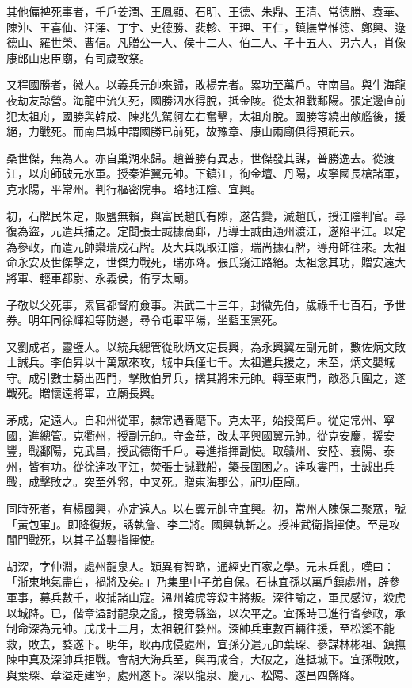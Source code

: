 \begin{pinyinscope}
其他偏裨死事者，千戶姜潤、王鳳顯、石明、王德、朱鼎、王清、常德勝、袁華、陳沖、王喜仙、汪澤、丁宇、史德勝、裴軫、王理、王仁，鎮撫常惟德、鄭興、逯德山、羅世榮、曹信。凡贈公一人、侯十二人、伯二人、子十五人、男六人，肖像康郎山忠臣廟，有司歲致祭。

又程國勝者，徽人。以義兵元帥來歸，敗楊完者。累功至萬戶。守南昌。與牛海龍夜劫友諒營。海龍中流矢死，國勝泅水得脫，抵金陵。從太祖戰鄱陽。張定邊直前犯太祖舟，國勝與韓成、陳兆先駕舸左右奮擊，太祖舟脫。國勝等繞出敵艦後，援絕，力戰死。而南昌城中謂國勝已前死，故豫章、康山兩廟俱得預祀云。

桑世傑，無為人。亦自巢湖來歸。趙普勝有異志，世傑發其謀，普勝逸去。從渡江，以舟師破元水軍。授秦淮翼元帥。下鎮江，徇金壇、丹陽，攻寧國長槍諸軍，克水陽，平常州。判行樞密院事。略地江陰、宜興。

初，石牌民朱定，販鹽無賴，與富民趙氏有隙，遂告變，滅趙氏，授江陰判官。尋復為盜，元遣兵捕之。定聞張士誠據高郵，乃導士誠由通州渡江，遂陷平江。以定為參政，而遣元帥欒瑞戍石牌。及大兵既取江陰，瑞尚據石牌，導舟師往來。太祖命永安及世傑擊之，世傑力戰死，瑞亦降。張氏窺江路絕。太祖念其功，贈安遠大將軍、輕車都尉、永義侯，侑享太廟。

子敬以父死事，累官都督府僉事。洪武二十三年，封徽先伯，歲祿千七百石，予世券。明年同徐輝祖等防邊，尋令屯軍平陽，坐藍玉黨死。

又劉成者，靈璧人。以統兵總管從耿炳文定長興，為永興翼左副元帥，數佐炳文敗士誠兵。李伯昇以十萬眾來攻，城中兵僅七千。太祖遣兵援之，未至，炳文嬰城守。成引數士騎出西門，擊敗伯昇兵，擒其將宋元帥。轉至東門，敵悉兵圍之，遂戰死。贈懷遠將軍，立廟長興。

茅成，定遠人。自和州從軍，隸常遇春麾下。克太平，始授萬戶。從定常州、寧國，進總管。克衢州，授副元帥。守金華，改太平興國翼元帥。從克安慶，援安豐，戰鄱陽，克武昌，授武德衛千戶。尋進指揮副使。取贛州、安陸、襄陽、泰州，皆有功。從徐達攻平江，焚張士誠戰船，築長圍困之。達攻婁門，士誠出兵戰，成擊敗之。突至外郛，中叉死。贈東海郡公，祀功臣廟。

同時死者，有楊國興，亦定遠人。以右翼元帥守宜興。初，常州人陳保二聚眾，號「黃包軍」。即降復叛，誘執詹、李二將。國興執斬之。授神武衛指揮使。至是攻閶門戰死，以其子益襲指揮使。

胡深，字仲淵，處州龍泉人。穎異有智略，通經史百家之學。元末兵亂，嘆曰：「浙東地氣盡白，禍將及矣。」乃集里中子弟自保。石抹宜孫以萬戶鎮處州，辟參軍事，募兵數千，收捕諸山寇。溫州韓虎等殺主將叛。深往諭之，軍民感泣，殺虎以城降。已，偕章溢討龍泉之亂，搜旁縣盜，以次平之。宜孫時已進行省參政，承制命深為元帥。戊戌十二月，太祖親征婺州。深帥兵車數百輛往援，至松溪不能救，敗去，婺遂下。明年，耿再成侵處州，宜孫分遣元帥葉琛、參謀林彬祖、鎮撫陳中真及深帥兵拒戰。會胡大海兵至，與再成合，大破之，進抵城下。宜孫戰敗，與葉琛、章溢走建寧，處州遂下。深以龍泉、慶元、松陽、遂昌四縣降。


\end{pinyinscope}
